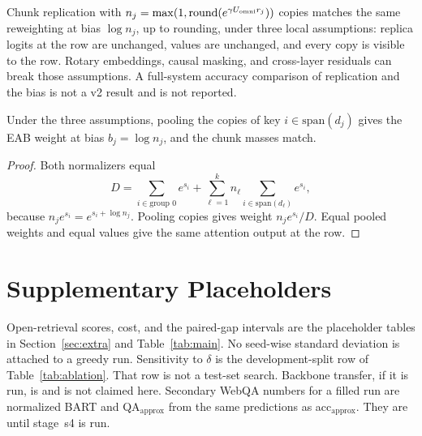 Chunk replication with $n_j=\max(1,\mathrm{round}(e^{\gamma U_{\mathrm{omni}} r_j}))$ copies matches the same reweighting at bias $\log n_j$, up to rounding, under three local assumptions: replica logits at the row are unchanged, values are unchanged, and every copy is visible to the row.
Rotary embeddings, causal masking, and cross-layer residuals can break those assumptions.
A full-system accuracy comparison of replication and the bias is not a v2 result and is not reported.

\begin{proposition}
\label{thm:dca-local}
Under the three assumptions, pooling the copies of key $i\in\mathrm{span}(d_j)$ gives the EAB weight at bias $b_j=\log n_j$, and the chunk masses match.
\end{proposition}

\begin{proof}
Both normalizers equal
\begin{equation}
D=\sum_{i\in\text{group }0}e^{s_i}+\sum_{\ell=1}^{k}n_\ell\sum_{i\in\mathrm{span}(d_\ell)}e^{s_i},
\label{eq:dca-norm}
\end{equation}
because $n_j e^{s_i}=e^{s_i+\log n_j}$.
Pooling copies gives weight $n_j e^{s_i}/D$.
Equal pooled weights and equal values give the same attention output at the row.
\end{proof}

\section{Supplementary Placeholders}
\label{app:supp}
Open-retrieval scores, cost, and the paired-gap intervals are the placeholder tables in Section~\ref{sec:extra} and Table~\ref{tab:main}.
No seed-wise standard deviation is attached to a greedy run.
Sensitivity to $\delta$ is the development-split row of Table~\ref{tab:ablation}.
That row is not a test-set search.
Backbone transfer, if it is run, is \ph{} and is not claimed here.
Secondary WebQA numbers for a filled run are normalized BART and QA$_{\mathrm{approx}}$ from the same predictions as acc$_{\mathrm{approx}}$.
They are \ph{} until stage~s4 is run.

